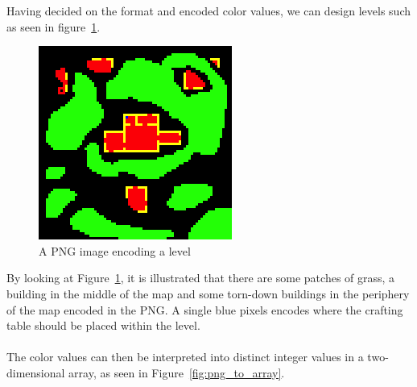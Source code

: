 Having decided on the format and encoded color values, we can design levels such as seen in figure~\ref{fig:png_map}.

\begin{figure}[H]
    \centering
    \includegraphics{figures/generating_levels/map.png}
    \caption{A PNG image encoding a level}
    \label{fig:png_map}
\end{figure}
By looking at Figure~\ref{fig:png_map}, it is illustrated that there are some patches of grass, a building in the middle of the map and some torn-down buildings in the periphery of the map encoded in the PNG.
A single blue pixels encodes where the crafting table should be placed within the level.
\\\\
The color values can then be interpreted into distinct integer values in a two-dimensional array, as seen in Figure~\ref{fig:png_to_array}.
